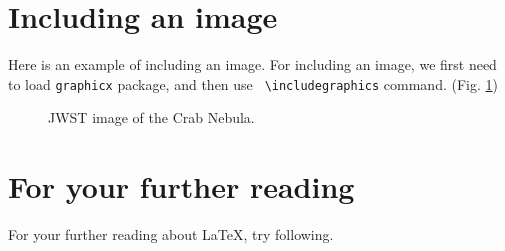 \documentclass{article}
\begin{document}
 \section{Including an image}

 Here is an example of including an image. For including an image, we
 first need to load {\tt graphicx} package, and then use {\tt
 \textbackslash includegraphics} command. (Fig. \ref{m1_jwst})

 \begin{figure}[htbp]
  \begin{center}
  \end{center}
  \caption{JWST image of the Crab Nebula.}
  \label{m1_jwst}
 \end{figure}

 \section{For your further reading}

 For your further reading about \LaTeX, try following.
\end{document}
